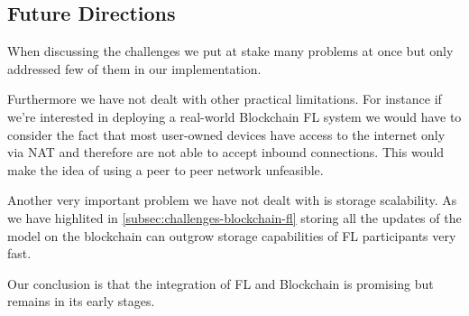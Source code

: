\subsection*{Future Directions}
When discussing the challenges we put at stake many problems at once but only addressed few of them in our
implementation.

Furthermore we have not dealt with other practical limitations. For instance if we're interested in deploying
a real-world Blockchain FL system we would have to consider the fact that most user-owned devices have
access to the internet only via NAT and therefore are not able to accept inbound connections. This would make
the idea of using a peer to peer network unfeasible.

Another very important problem we have not dealt with is storage scalability. As we have highlited in
\ref{subsec:challenges-blockchain-fl}
storing all the updates of the model on the blockchain can outgrow storage capabilities of FL participants very fast.

Our conclusion is that the integration of FL and Blockchain is promising but remains in its early stages.
